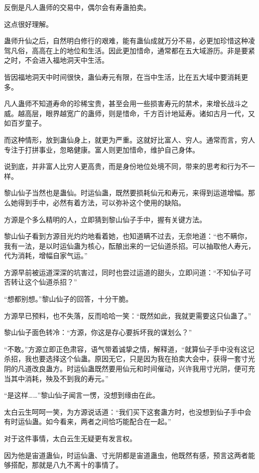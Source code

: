 \begin{this_body}
反倒是凡人蛊师的交易中，偶尔会有寿蛊拍卖。

这点很好理解。

蛊师升仙之后，自然明白修行的艰难，能有蛊仙成就万分不易，必更加珍惜这种凌驾凡俗，高高在上的地位和生活。因此更加惜命，通常都在五大域游历。非是要紧之时，不会进入福地洞天中生活。

皆因福地洞天中时间很快，蛊仙寿元有限，在当中生活，比在五大域中要消耗更多。

凡人蛊师不知道寿命的珍稀宝贵，甚至会用一些损害寿元的禁术，来增长战斗之威。越高层，眼界越宽广的蛊师，则是惜命，千方百计地延寿。诸如古月一代，又如百岁童子。

而这种情形，放到蛊仙身上，就更为严重。这就好比富人、穷人。通常而言，穷人专注于打拼事业，忽略健康。富人则更加惜命，维护自己身体。

说到底，并非富人比穷人更高贵，而是身份地位处境不同，带来的思考和行为不一样。

黎山仙子当然也是蛊仙。时运仙蛊，既然要损耗仙元和寿元，来得到运道增幅。那么她得到手中，必然有着方法，可以弥补这个使用的缺陷。

方源是个多么精明的人，立即猜到黎山仙子手中，握有关键方法。

黎山仙子看到方源目光灼灼地看着她，也知道瞒不过去，无奈地道：“也不瞒你，我有一法，是以时运仙蛊为核心，酝酿出来的一记仙道杀招。可以抽取他人寿元，代为消耗，增幅自家气运。”

方源早前被运道深深的坑害过，同时也尝过运道的甜头，立即问道：“不知仙子可否转让这个仙道杀招？”

“想都别想。”黎山仙子的回答，十分干脆。

方源早已预料，也不失落，反而哈哈一笑：“既然如此，我就更需要这只仙蛊了。”

黎山仙子面色转冷：“方源，你这是存心要拆坏我的谋划么？”

“不敢。”方源立即正色肃容，语气带着诚挚之情，解释道，“就算仙子手中没有这记杀招，我也要选择这个仙蛊。原因无它，只是因为我在拍卖大会中，获得一套寸光阴的凡道改良蛊方。时运仙蛊既然要用仙元和时间催动，兴许我用寸光阴，便可充当其中消耗，殃及不到我的寿元。”

“是这样……”黎山仙子闻言一愣，没想到缘由在此。

太白云生呵呵一笑，为方源说话道：“我们买下这套蛊方时，也没想到仙子手中会有时运仙蛊。如今看来，两者之间恰巧能配合在一起。”

对于这件事情，太白云生无疑更有发言权。

因为他是宙道蛊仙，时运仙蛊、寸光阴都是宙道蛊虫，他既然有感，预言这两者能够搭配，那就是八九不离十的事情了。


\end{this_body}
